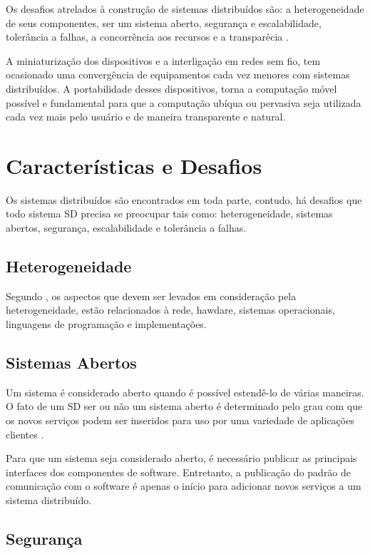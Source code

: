 \documentclass[
	12pt,				%
	oneside,			%
	a4paper,			%
	english,			%
	brazil				%
	]{abntex2ppgsi}
\begin{document}
Os desafios atrelados à construção de sistemas distribuídos são: a heterogeneidade de seus componentes, ser um sistema aberto, segurança e escalabilidade, tolerância a falhas, a concorrência aos recursos e a transparêcia \cite{coulouris2013sistemas}.

A miniaturização dos dispositivos  e a interligação em redes sem fio, tem ocasionado uma convergência de equipamentos cada vez menores com sistemas distribuídos. A portabilidade desses dispositivos, torna a computação móvel possível e fundamental para que a computação ubíqua ou pervasiva seja utilizada cada vez mais pelo usuário e de maneira transparente e natural.

\section{Características e Desafios}

Os sistemas distribuídos são encontrados em toda parte, contudo, há desafios que todo sistema SD precisa se preocupar tais como: heterogeneidade, sistemas abertos,  segurança, escalabilidade e tolerância a falhas.

\subsection{Heterogeneidade}

Segundo , os aspectos que devem ser levados em consideração pela heterogeneidade, estão relacionados à rede, hawdare, sistemas operacionais, linguagens de programação e implementações.

\subsection{Sistemas Abertos}

Um sistema é considerado aberto quando é possível estendê-lo de várias maneiras. O fato de um SD ser ou não um sistema aberto é determinado pelo grau com que os novos serviços podem ser inseridos para uso por uma variedade de aplicações clientes \cite{coulouris2013sistemas}.

Para que um sistema seja considerado aberto, é necessário publicar as principais interfaces dos componentes de software. Entretanto, a publicação do padrão de comunicação com o software é apenas o início para adicionar novos serviços a um sistema distribuído.

\subsection{Segurança}
\end{document}
